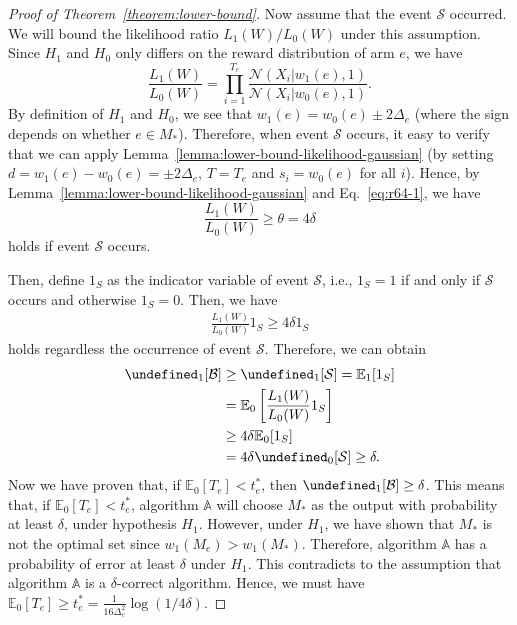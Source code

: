 \documentclass{article}
\newcommand{\E}{\mathbb E}
\let\Pr\undefined
\DeclareMathOperator{\Pr}{Pr}
\begin{document}
\begin{proof}[Proof of Theorem~\ref{theorem:lower-bound}]
Now assume that the event $\mathcal S$ occurred.
We will bound the likelihood ratio $L_1(W)/L_0(W)$ under this assumption. 
Since $H_1$ and $H_0$ only differs on the reward distribution of arm $e$, we have
\begin{equation}
\label{eq:r64-1}
\frac{L_1(W)}{L_0(W)} = \prod_{i=1}^{T_e} \frac{\mathcal N(X_i | w_1(e), 1)}{\mathcal N(X_i | w_0(e), 1)}.
\end{equation}
By definition of $H_1$ and $H_0$, we see that $w_1(e) = w_0(e)\pm 2\Delta_e$ (where the sign depends on whether $e\in M_*$).
Therefore, when event $\mathcal S$ occurs, it easy to verify that we can apply Lemma~\ref{lemma:lower-bound-likelihood-gaussian} (by setting $d=w_1(e)-w_0(e)=\pm2\Delta_e$, $T=T_e$ and $s_i=w_0(e)$ for all $i$).
Hence, by Lemma~\ref{lemma:lower-bound-likelihood-gaussian} and Eq.~\eqref{eq:r64-1}, we have
\begin{equation*}
\frac{L_1(W)}{L_0(W)} \ge \theta = 4\delta
\end{equation*}
holds if event $\mathcal S$ occurs.

Then, define $1_S$ as the indicator variable of event $\mathcal S$, i.e., $1_S = 1$ if and only if $\mathcal S$ occurs and otherwise $1_S = 0$.
Then, we have
\begin{align*}
\frac{L_1(W)}{L_0(W)} 1_S \ge 4\delta 1_S
\end{align*}
holds regardless the occurrence of event $\mathcal S$.
Therefore, we can obtain
\begin{align*}
\Pr_1[\mathcal B] &\ge \Pr_1[\mathcal S] = \E_1[1_S] \\
				  &= \E_0\left[\frac{L_1(W)}{L_0(W)} 1_S\right] \\
				  &\ge 4\delta \E_0[1_S] \\
				  &= 4\delta \Pr_0[\mathcal S]\ge \delta.
\end{align*}
Now we have proven that, if $\E_0[T_e] < t_e^*$, then $\Pr_1[\mathcal B] \ge \delta$.
This means that, if $\E_0[T_e] < t_e^*$, algorithm $\mathbb A$ will choose $M_*$ as the output with probability at least $\delta$, under hypothesis $H_1$.
However, under $H_1$, we have shown that $M_*$ is not the optimal set since $w_1(M_e) > w_1(M_*)$.
Therefore, algorithm $\mathbb A$ has a probability of error at least $\delta$ under $H_1$. 
This contradicts to the assumption that algorithm $\mathbb A$ is a $\delta$-correct algorithm.
Hence, we must have $\E_0[T_e] \ge t_e^* = \frac{1}{16\Delta_e^2}\log(1/4\delta)$.
\end{proof}
\end{document}
